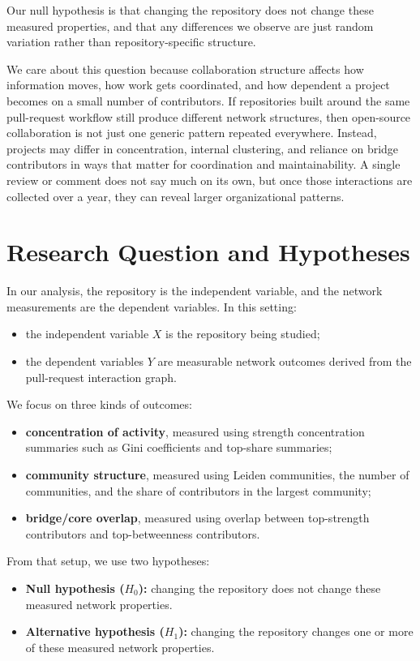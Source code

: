 \documentclass[11pt]{article}
\begin{document}
Our null hypothesis is that changing the repository does not change these measured properties, and that any differences we observe are just random variation rather than repository-specific structure.

We care about this question because collaboration structure affects how information moves, how work gets coordinated, and how dependent a project becomes on a small number of contributors. If repositories built around the same pull-request workflow still produce different network structures, then open-source collaboration is not just one generic pattern repeated everywhere. Instead, projects may differ in concentration, internal clustering, and reliance on bridge contributors in ways that matter for coordination and maintainability. A single review or comment does not say much on its own, but once those interactions are collected over a year, they can reveal larger organizational patterns.

\section{Research Question and Hypotheses}
In our analysis, the repository is the independent variable, and the network measurements are the dependent variables. In this setting:
\begin{itemize}[leftmargin=1.5em]
    \item the independent variable $X$ is the repository being studied;
    \item the dependent variables $Y$ are measurable network outcomes derived from the pull-request interaction graph.
\end{itemize}

We focus on three kinds of outcomes:
\begin{itemize}[leftmargin=1.5em]
    \item \textbf{concentration of activity}, measured using strength concentration summaries such as Gini coefficients and top-share summaries;
    \item \textbf{community structure}, measured using Leiden communities, the number of communities, and the share of contributors in the largest community;
    \item \textbf{bridge/core overlap}, measured using overlap between top-strength contributors and top-betweenness contributors.
\end{itemize}

From that setup, we use two hypotheses:
\begin{itemize}[leftmargin=1.5em]
    \item \textbf{Null hypothesis ($H_0$):} changing the repository does not change these measured network properties.
    \item \textbf{Alternative hypothesis ($H_1$):} changing the repository changes one or more of these measured network properties.
\end{itemize}
\end{document}
